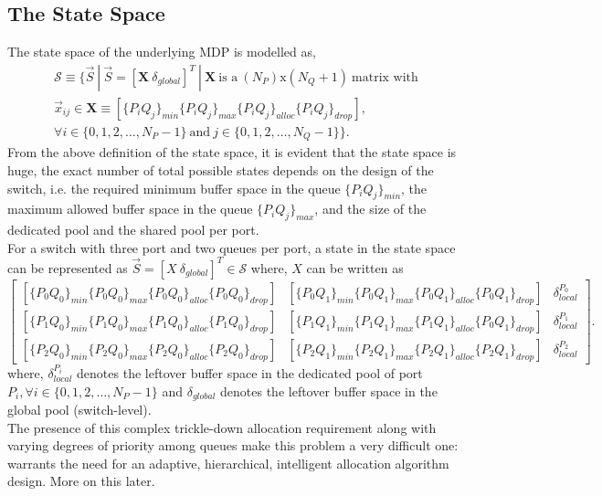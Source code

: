 \documentclass{article}
\begin{document}
\subsection{The State Space}
The state space of the underlying MDP is modelled as,
\begin{equation}
    \begin{aligned}
        \mathcal{S} \equiv \{\vec{S}\ |\ \vec{S} = [\textbf{X}\ \delta_{global}]^T\ |\ \textbf{X}\ \text{is a}\ (N_P) \text{x} (N_Q+1)\ \text{matrix with}\ \\\vec{x}_{ij} \in \textbf{X} \equiv [\{P_i Q_j\}_{min} \{P_i Q_j\}_{max} \{P_i Q_j\}_{alloc} \{P_i Q_j\}_{drop}],\ \\
        \forall i \in \{0, 1, 2, \dots, N_P-1\}\ \text{and}\ j \in \{0, 1, 2, \dots, N_Q-1\}\}.
    \end{aligned}
\end{equation}
From the above definition of the state space, it is evident that the state space is huge, the exact number of total possible states depends on the design of the switch, i.e. the required minimum buffer space in the queue $\{P_i Q_j\}_{min}$, the maximum allowed buffer space in the queue $\{P_i Q_j\}_{max}$, and the size of the dedicated pool and the shared pool per port.
\\For a switch with three port and two queues per port, a state in the state space can be represented as $\vec{S} = [X\ \delta_{global}]^T \in \mathcal{S}$ where, $X$ can be written as
$$
\begin{bmatrix} 
[\{P_0 Q_0\}_{min} \{P_0 Q_0\}_{max} \{P_0 Q_0\}_{alloc} \{P_0 Q_0\}_{drop}] & [\{P_0 Q_1\}_{min} \{P_0 Q_1\}_{max} \{P_0 Q_1\}_{alloc} \{P_0 Q_1\}_{drop}] & \delta_{local}^{P_0}\\
[\{P_1 Q_0\}_{min} \{P_1 Q_0\}_{max} \{P_1 Q_0\}_{alloc} \{P_1 Q_0\}_{drop}] & [\{P_1 Q_1\}_{min} \{P_1 Q_1\}_{max} \{P_1 Q_1\}_{alloc} \{P_0 Q_1\}_{drop}] & \delta_{local}^{P_1}\\
[\{P_2 Q_0\}_{min} \{P_2 Q_0\}_{max} \{P_2 Q_0\}_{alloc} \{P_2 Q_0\}_{drop}] & [\{P_2 Q_1\}_{min} \{P_2 Q_1\}_{max} \{P_2 Q_1\}_{alloc} \{P_2 Q_1\}_{drop}] & \delta_{local}^{P_2}
\end{bmatrix}
.
$$
where, $\delta_{local}^{P_i}$ denotes the leftover buffer space in the dedicated pool of port $P_i, \forall i \in \{0, 1, 2, \dots, N_P-1\}$ and $\delta_{global}$ denotes the leftover buffer space in the global pool (switch-level). 
\\The presence of this complex trickle-down allocation requirement along with varying degrees of priority among queues make this problem a very difficult one: warrants the need for an adaptive, hierarchical, intelligent allocation algorithm design. More on this later.
\end{document}
